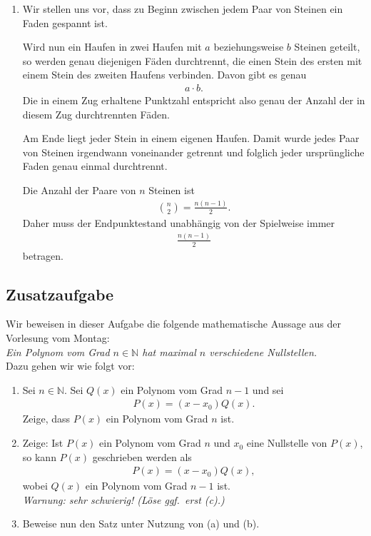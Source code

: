 \documentclass[a4paper,10pt]{article}
\newcommand{\N}{\mathbb{N}}
\begin{document}
{\begin{enumerate}[label=(\alph*)]
    \item[(c*)]
    Wir stellen uns vor, dass zu Beginn zwischen jedem Paar von Steinen ein Faden gespannt ist.

    Wird nun ein Haufen in zwei Haufen mit $a$ beziehungsweise $b$ Steinen geteilt, so werden genau diejenigen Fäden durchtrennt, die einen Stein des ersten mit einem Stein des zweiten Haufens verbinden. Davon gibt es genau
    \begin{align*}
        a\cdot b.
    \end{align*}
    Die in einem Zug erhaltene Punktzahl entspricht also genau der Anzahl der in diesem Zug durchtrennten Fäden.

    Am Ende liegt jeder Stein in einem eigenen Haufen. Damit wurde jedes Paar von Steinen irgendwann voneinander getrennt und folglich jeder ursprüngliche Faden genau einmal durchtrennt.

    Die Anzahl der Paare von $n$ Steinen ist
    \begin{align*}
        \binom{n}{2}=\frac{n(n-1)}{2}.
    \end{align*}
    Daher muss der Endpunktestand unabhängig von der Spielweise immer
    \begin{align*}
        \frac{n(n-1)}{2}
    \end{align*}
    betragen.
\end{enumerate}
}

\subsection*{Zusatzaufgabe}

Wir beweisen in dieser Aufgabe die folgende mathematische Aussage aus der Vorlesung vom Montag:\\
\emph{Ein Polynom vom Grad $n \in \N$ hat maximal $n$ verschiedene Nullstellen.}\\
Dazu gehen wir wie folgt vor:
\begin{enumerate}[label=(\alph*)]
    \item Sei $n \in \N$. Sei $Q(x)$ ein Polynom vom Grad $n-1$ und sei
    \begin{align*}
        P(x)=(x-x_0)Q(x).
    \end{align*}
    Zeige, dass $P(x)$ ein Polynom vom Grad $n$ ist.

    \item Zeige: Ist $P(x)$ ein Polynom vom Grad $n$ und $x_0$ eine Nullstelle von $P(x)$, so kann $P(x)$ geschrieben werden als
    \begin{align*}
        P(x)=(x-x_0)Q(x),
    \end{align*}
    wobei $Q(x)$ ein Polynom vom Grad $n-1$ ist.\\
    \textit{Warnung: sehr schwierig! (Löse ggf.\ erst (c).)}

    \item Beweise nun den Satz unter Nutzung von (a) und (b).
\end{enumerate}
\end{document}
